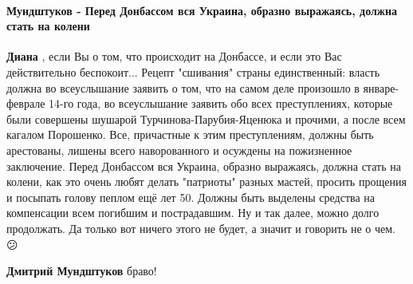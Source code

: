  
 
 
 
 
\paragraph{Мундштуков - Перед Донбассом вся Украина, образно выражаясь, должна стать на колени}
\label{sec:31_07_2021.fb.panchenko_diana.1.oko_za_oko.cmt.mundshtukov_pokajanie}

\begin{itemize}
 
\textbf{Диана} , если Вы о том, что происходит на Донбассе, и если это Вас
действительно беспокоит... Рецепт "сшивания" страны единственный: власть должна
во всеуслышание заявить о том, что на самом деле произошло в январе-феврале
14-го года, во всеуслышание заявить обо всех преступлениях, которые были
совершены шушарой Турчинова-Парубия-Яценюка и прочими, а после всем кагалом
Порошенко. Все, причастные к этим преступлениям, должны быть арестованы, лишены
всего наворованного и осуждены на пожизненное заключение. Перед Донбассом вся
Украина, образно выражаясь, должна стать на колени, как это очень любят делать
"патриоты" разных мастей, просить прощения и посыпать голову пеплом ещё лет 50.
Должны быть выделены средства на компенсации всем погибшим и пострадавшим. Ну и
так далее, можно долго продолжать. Да только вот ничего этого не будет, а
значит и говорить не о чем. 😕

\begin{itemize}
 
\textbf{Дмитрий Мундштуков} браво!👏

 

\end{itemize}
\end{itemize}
